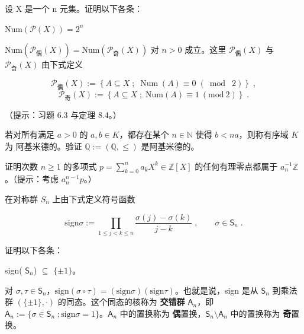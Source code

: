 \begin{exercises}
\begin{items}
\end{items}

\item

设 X 是一个 n 元集。证明以下各条：

\begin{items}
\item

$ \mathrm{Num}\left(\mathcal{P}(X)\right)=2^{n} $

\item

$ \mathrm{Num}\left(\mathcal{P}_{\text{偶}}(X)\right) = \mathrm{Num}\left(\mathcal{P}_{\text{奇}}(X)\right) $ 对 $ n > 0 $ 成立。这里 $ \mathcal{P}_{\text{偶}}(X) $ 与 $ \mathcal{P}_{\text{奇}}(X) $ 由下式定义

\[
\mathcal{P}_{\text{偶}}(X):=\left\{A\subseteq X\;;\;\operatorname{N u m}(A)\equiv0\;(\bmod\;2)\right\}\;,
\]
\[
{\mathcal P}_{\text{奇}}(X):=\left\{A\subseteq X\;;\;\mathrm{N u m}(A)\equiv1\ (\mathrm{m o d}\ 2)\right\}\;.
\]

（提示：习题 6.3 与定理 8.4。）

\end{items}

\item

若对所有满足 $ a > 0 $ 的 $ a, b \in K $，都存在某个 $ n \in \mathbb{N} $ 使得 $ b < na $，则称有序域 $ K $ 为 $ \text{阿基米德的} $。验证 $ \mathbb{Q} := (\mathbb{Q}, \leq) $ 是阿基米德的。

\item

证明次数 $ n \geq 1 $ 的多项式 $ p = \sum_{k=0}^{n} a_k X^k \in \mathbb{Z}[X] $ 的任何有理零点都属于 $ a_n^{-1} \mathbb{Z} $。（提示：考虑 $ a_n^{n-1} p $。）

\item

在对称群 $ S_{n} $ 上由下式定义符号函数

\[
\mathrm{s i g n}\sigma:=\prod_{1\leq j<k\leq n}\frac{\sigma(j)-\sigma(k)}{j-k}\;,\qquad\sigma\in\mathsf{S}_{n}\;.
\]

证明以下各条：

\begin{items}
\item

sign( $ \mathsf{S}_n $) $ \subseteq $ $ \{\pm1\} $。

\item

对 $ \sigma, \tau \in \mathsf{S}_n $，$ \text{sign}(\sigma \circ \tau) = (\text{sign} \sigma)(\text{sign} \tau) $。也就是说，sign 是从 $ \mathsf{S}_n $ 到乘法群 $ \left(\{\pm1\}, \cdot\right) $ 的同态。这个同态的核称为 \textbf{交错群} $ \mathsf{A}_n $，即 $ \mathsf{A}_n := \{\sigma \in \mathsf{S}_n\;; \text{sign} \sigma = 1\} $。$ \mathsf{A}_n $ 中的置换称为 \textbf{偶}置换，$ \mathsf{S}_n \setminus \mathsf{A}_n $ 中的置换称为 \textbf{奇}置换。


\end{items}
\end{exercises}
